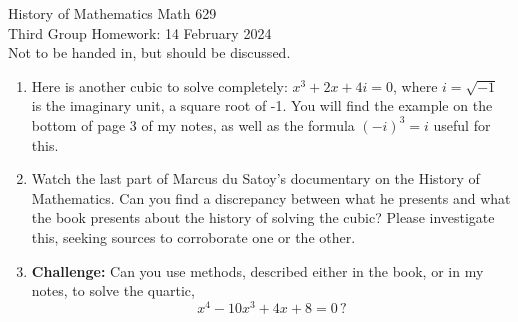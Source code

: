 \documentclass[12pt]{article}
\begin{document}
\LARGE 
\noindent
{\color{Maroon}History of Mathematics \hfill Math 629}\vspace{2pt}\\
\large
Third Group Homework: \hfill 14 February 2024\\
Not to be handed in, but should be discussed.
\normalsize\vspace{10pt}




\begin{enumerate}

   
  \item  
    Here is another cubic to solve completely: $x^3+2x+4i=0$, where $i=\sqrt{-1}$ is the imaginary unit, a square root
    of -1.
    You will find the example on the bottom of page 3 of my notes, as well as the formula $(-i)^3=i$ useful for this.

    

  \item
    Watch the last part of Marcus du Satoy's documentary on the History of Mathematics.
    Can you find a discrepancy between what he presents and what the book presents about the history of solving the cubic?
    Please investigate this, seeking sources to corroborate one or the other.


  \item {\bf Challenge:}  Can you use methods, described either in the book, or in my notes, to solve the quartic,
    \[
    x^4 - 10 x^3 +4x + 8 = 0\,?
    \]
    
\end{enumerate}
\end{document}
